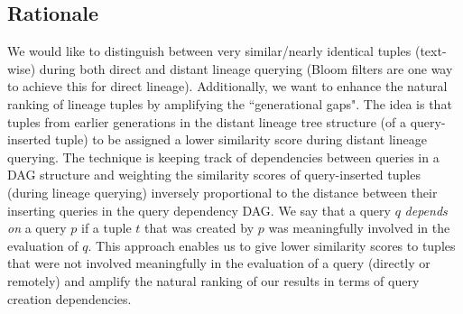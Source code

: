 \subsection{Rationale} We would like to distinguish between very similar/nearly identical tuples (text-wise) during both direct and distant lineage querying (Bloom filters are one way to achieve this for direct lineage). 
Additionally, we want to enhance the natural ranking of lineage tuples by amplifying the ``generational gaps". The idea is that tuples from earlier generations in the distant lineage tree structure (of a query-inserted tuple) to be assigned a lower similarity score during distant lineage querying. 
The technique is keeping track of dependencies between queries in a DAG structure and weighting the similarity scores of query-inserted tuples (during lineage querying) inversely proportional to the distance between their inserting queries in the query dependency DAG. We say that a query $q$ \textit{depends on} a query $p$ if a tuple $t$ that was created by $p$ was meaningfully involved in the evaluation of $q$.
This approach enables us to give lower similarity scores to tuples that were not involved meaningfully in the evaluation of a query (directly or remotely) and amplify the natural ranking of our results in terms of query creation dependencies.\\

